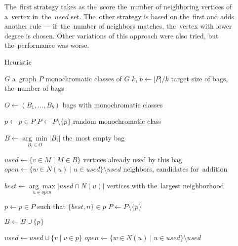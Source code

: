 The~first strategy \Neighbors{} takes as the~score the~number of
neighboring vertices of a~vertex in~the~$used$ set.
The~other strategy \NeighborsDegree{} is based
on the~first and adds another rule ---
if~the~number of neighbors matches, the~vertex with lower degree is chosen.
%
Other variations of this approach were also tried,
but the~performance was worse.


\begin{algorithm}[ht]
	\caption{Heuristic \Neighbors}%
	\label{alg:neighbors}
	\begin{algorithmic}[1]

		\Require{} $G$
		\Comment{} a~graph
		\Require{} $P$
		\Comment{} monochromatic classes of $G$
		\Require{} $k$, $b \gets |P|/k$
		\Comment{} target size of bags, the~number of bags

		\Ensure{} $O \gets (B_1, \ldots, B_b)$
		\Comment{} bags with monochromatic classes

		\State{} $p \gets p \in P$
		\State{} $P \gets P \setminus \{p\}$
		\Comment{} random monochromatic class

		\State{} $B \gets \underset{B_i \in O}{\arg\min} |B_i|$
		\Comment{} the~most empty bag

		\State{} $used \gets \{{v \in M} \mid {M \in B } \}$
		\Comment{} vertices already used by this bag
		\State{} $open \gets  \{w \in N(u) \mid u \in used\} \setminus used $
		\Comment{} neighbors, candidates for~addition


		\State{} $best \gets \underset{u \in open}{\arg\max}|used \cap N(u)|$
		\Comment{} vertices with the~largest neighborhood

		\State{} $p \gets p \in P$ such that $\{best, n\} \in p$
		\State{} $P \gets P \setminus \{p\}$

		\State{} $B \gets B \cup \{p\}$

		\State{} $used \gets used \cup \{v \mid {v \in p} \}$
		\State{} $open \gets  \{w \in N(u) \mid u \in used\} \setminus used $
		\EndFor{}
		\EndWhile{}
		\EndWhile{}
	\end{algorithmic}
\end{algorithm}

\subsubsection*{\CyclesMatchChunks{}}

